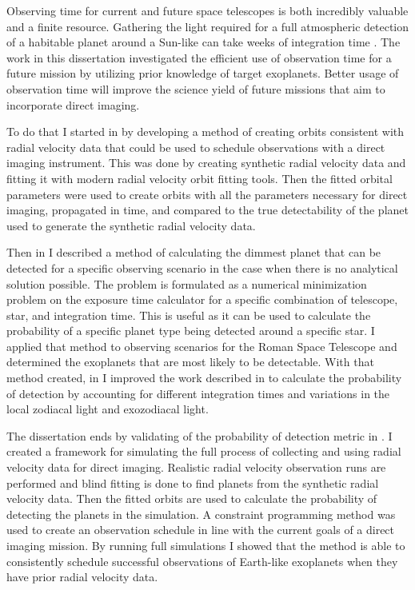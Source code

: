 Observing time for current and future space telescopes is both incredibly
valuable and a finite resource. Gathering the light required for a full
atmospheric detection of a habitable planet around a Sun-like can take weeks of
integration time \citep{TheLUVOIRTeam2019}. The work in this dissertation
investigated the efficient use of observation time for a future mission by
utilizing prior knowledge of target exoplanets. Better usage of observation
time will improve the science yield of future missions that aim to incorporate
direct imaging.

To do that I started in  by developing a method of
creating orbits consistent with radial velocity data that could be used to
schedule observations with a direct imaging instrument. This was done by
creating synthetic radial velocity data and fitting it with modern radial
velocity orbit fitting tools. Then the fitted orbital parameters were used to
create orbits with all the parameters necessary for direct imaging, propagated
in time, and compared to the true detectability of the planet used to generate
the synthetic radial velocity data.

Then in  I described a method of calculating the dimmest
planet that can be detected for a specific observing scenario in the case when
there is no analytical solution possible. The problem is formulated as a
numerical minimization problem on the exposure time calculator for a specific
combination of telescope, star, and integration time. This is useful as it can
be used to calculate the probability of a specific planet type being detected
around a specific star. I applied that method to observing scenarios for the
Roman Space Telescope and determined the exoplanets that are most likely to be
detectable. With that method created, in  I improved
the work described in  to calculate the probability of
detection by accounting for different integration times and variations in the
local zodiacal light and exozodiacal light.

The dissertation ends by validating of the probability of detection metric in
. I created a framework for simulating the full
process of collecting and using radial velocity data for direct imaging.
Realistic radial velocity observation runs are performed and blind fitting is
done to find planets from the synthetic radial velocity data. Then the fitted
orbits are used to calculate the probability of detecting the planets in the
simulation. A constraint programming method was used to create an observation
schedule in line with the current goals of a direct imaging mission. By running
full simulations I showed that the method is able to consistently schedule
successful observations of Earth-like exoplanets when they have prior radial
velocity data.

